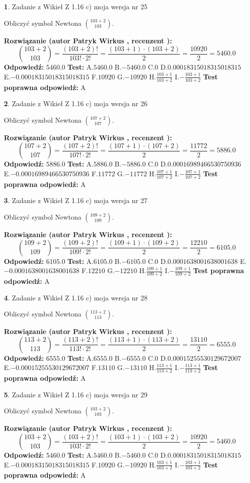 \documentclass[12pt, a4paper]{article}
\theoremstyle{definition} %
\newtheorem{zad}{}
\newcommand{\zadStart}[1]{\begin{zad}#1\newline}
\newcommand{\zadStop}{\end{zad}}
\newcommand{\rozwStart}[2]{\noindent \textbf{Rozwiązanie (autor #1 , recenzent #2): }\newline}
\newcommand{\rozwStop}{\newline}
\newcommand{\odpStart}{\noindent \textbf{Odpowiedź:}\newline}
\newcommand{\odpStop}{\newline}
\newcommand{\testStart}{\noindent \textbf{Test:}\newline}
\newcommand{\testStop}{\newline}
\newcommand{\kluczStart}{\noindent \textbf{Test poprawna odpowiedź:}\newline}
\newcommand{\kluczStop}{\newline}
\begin{document}
\zadStart{Zadanie z Wikieł Z 1.16 c) moja wersja nr 25}

Obliczyć symbol Newtona ${103+2 \choose 103}$.
\zadStop
\rozwStart{Patryk Wirkus}{}
$${103+2 \choose 103} = \frac{(103+2)!}{103! \cdot 2!} = \frac{(103+1)\cdot(103+2)}{2} = \frac{10920}{2} = 5460.0$$
\rozwStop
\odpStart
$5460.0$
\odpStop
\testStart
A.$5460.0$ B.$-5460.0$ C.$0$ D.$0.00018315018315018315$ E.$-0.00018315018315018315$
F.$10920$ G.$-10920$
H.$\frac{103+1}{103+2}$
I.$-\frac{103+1}{103+2}$
\testStop
\kluczStart
A
\kluczStop



\zadStart{Zadanie z Wikieł Z 1.16 c) moja wersja nr 26}

Obliczyć symbol Newtona ${107+2 \choose 107}$.
\zadStop
\rozwStart{Patryk Wirkus}{}
$${107+2 \choose 107} = \frac{(107+2)!}{107! \cdot 2!} = \frac{(107+1)\cdot(107+2)}{2} = \frac{11772}{2} = 5886.0$$
\rozwStop
\odpStart
$5886.0$
\odpStop
\testStart
A.$5886.0$ B.$-5886.0$ C.$0$ D.$0.00016989466530750936$ E.$-0.00016989466530750936$
F.$11772$ G.$-11772$
H.$\frac{107+1}{107+2}$
I.$-\frac{107+1}{107+2}$
\testStop
\kluczStart
A
\kluczStop



\zadStart{Zadanie z Wikieł Z 1.16 c) moja wersja nr 27}

Obliczyć symbol Newtona ${109+2 \choose 109}$.
\zadStop
\rozwStart{Patryk Wirkus}{}
$${109+2 \choose 109} = \frac{(109+2)!}{109! \cdot 2!} = \frac{(109+1)\cdot(109+2)}{2} = \frac{12210}{2} = 6105.0$$
\rozwStop
\odpStart
$6105.0$
\odpStop
\testStart
A.$6105.0$ B.$-6105.0$ C.$0$ D.$0.0001638001638001638$ E.$-0.0001638001638001638$
F.$12210$ G.$-12210$
H.$\frac{109+1}{109+2}$
I.$-\frac{109+1}{109+2}$
\testStop
\kluczStart
A
\kluczStop



\zadStart{Zadanie z Wikieł Z 1.16 c) moja wersja nr 28}

Obliczyć symbol Newtona ${113+2 \choose 113}$.
\zadStop
\rozwStart{Patryk Wirkus}{}
$${113+2 \choose 113} = \frac{(113+2)!}{113! \cdot 2!} = \frac{(113+1)\cdot(113+2)}{2} = \frac{13110}{2} = 6555.0$$
\rozwStop
\odpStart
$6555.0$
\odpStop
\testStart
A.$6555.0$ B.$-6555.0$ C.$0$ D.$0.00015255530129672007$ E.$-0.00015255530129672007$
F.$13110$ G.$-13110$
H.$\frac{113+1}{113+2}$
I.$-\frac{113+1}{113+2}$
\testStop
\kluczStart
A
\kluczStop



\zadStart{Zadanie z Wikieł Z 1.16 c) moja wersja nr 29}

Obliczyć symbol Newtona ${103+2 \choose 103}$.
\zadStop
\rozwStart{Patryk Wirkus}{}
$${103+2 \choose 103} = \frac{(103+2)!}{103! \cdot 2!} = \frac{(103+1)\cdot(103+2)}{2} = \frac{10920}{2} = 5460.0$$
\rozwStop
\odpStart
$5460.0$
\odpStop
\testStart
A.$5460.0$ B.$-5460.0$ C.$0$ D.$0.00018315018315018315$ E.$-0.00018315018315018315$
F.$10920$ G.$-10920$
H.$\frac{103+1}{103+2}$
I.$-\frac{103+1}{103+2}$
\testStop
\kluczStart
A
\kluczStop
\end{document}
